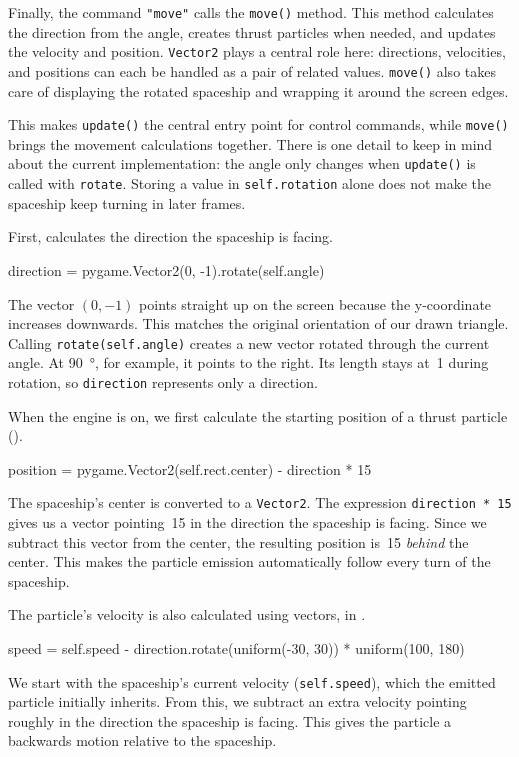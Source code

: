 Finally, the command \verb+"move"+ calls the \texttt{move()} method. This method calculates the direction from the angle, creates thrust particles when needed, and updates the velocity and position. \texttt{Vector2} plays a central role here: directions, velocities, and positions can each be handled as a pair of related values. \texttt{move()} also takes care of displaying the rotated spaceship and wrapping it around the screen edges.

This makes \texttt{update()} the central entry point for control commands, while \texttt{move()} brings the movement calculations together. There is one detail to keep in mind about the current implementation: the angle only changes when \texttt{update()} is called with \texttt{rotate}. Storing a value in \texttt{self.rotation} alone does not make the spaceship keep turning in later frames.

First,  calculates the direction the spaceship is facing. 
\begin{codebox}
	direction = pygame.Vector2(0, -1).rotate(self.angle)
\end{codebox}
The vector $(0, -1)$ points straight up on the screen because the y-coordinate increases downwards. This matches the original orientation of our drawn triangle. Calling \texttt{rotate(self.angle)} creates a new vector rotated through the current angle. At \SI{90}{\degree}, for example, it points to the right. Its length stays at~1 during rotation, so \texttt{direction} represents only a direction.

When the engine is on, we first calculate the starting position of a thrust particle (). 
\begin{codebox}
	position = pygame.Vector2(self.rect.center) - direction * 15
\end{codebox}
The spaceship's center is converted to a \texttt{Vector2}. The expression \texttt{direction * 15} gives us a vector pointing~\SI{15}{\pixel} in the direction the spaceship is facing. Since we subtract this vector from the center, the resulting position is~\SI{15}{\pixel} \emph{behind} the center. This makes the particle emission automatically follow every turn of the spaceship.

The particle's velocity is also calculated using vectors, in . 
\begin{codebox}
	speed = self.speed - direction.rotate(uniform(-30, 30)) * uniform(100, 180)
\end{codebox}
We start with the spaceship's current velocity (\texttt{self.speed}), which the emitted particle initially inherits. From this, we subtract an extra velocity pointing roughly in the direction the spaceship is facing. This gives the particle a backwards motion relative to the spaceship.


